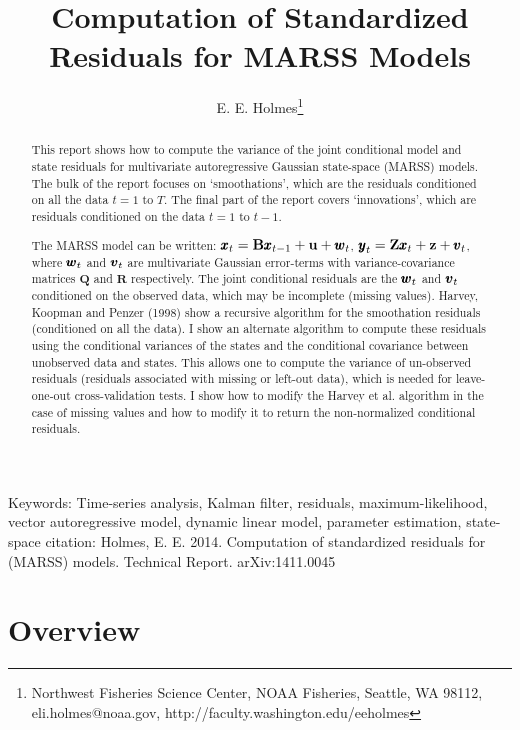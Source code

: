 \documentclass[]{article}
\def\UPS{\mbox{\boldmath $\Upsilon$}}
\def\XI{\mbox{\boldmath $\Xi$}}
\def\BB{\mbox{$\mathbf B$}}	\def\bb{\mbox{$\mathbf b$}} \def\Bb{\mbox{$\mathbf J$}} \def\Ba{\mbox{$\mathbf L$}} \def\Bm{\UPS}
\def\QQ{\mbox{$\mathbf Q$}}	 \def\qq{\mbox{$\mathbf q$}} \def\Qb{\mbox{$\mathbf G$}}  \def\Qm{\mathbb{Q}}
\def\RR{\mbox{$\mathbf R$}}	 \def\rr{\mbox{$\mathbf r$}} \def\Rb{\mbox{$\mathbf H$}}	\def\Rm{\mathbb{R}}
\def\ZZ{\mbox{$\mathbf Z$}}	\def\zz{\mbox{$\mathbf z$}}	\def\Zb{\mbox{$\mathbf M$}} \def\Za{\mbox{$\mathbf N$}} \def\Zm{\XI}
\begin{document}

\author{E. E. Holmes\footnote{Northwest Fisheries Science Center, NOAA Fisheries, Seattle, WA 98112, 
       eli.holmes@noaa.gov, http://faculty.washington.edu/eeholmes}}
\title{Computation of Standardized Residuals for MARSS Models}
\maketitle
\begin{abstract}
This report shows how to compute the variance of the joint conditional model and state residuals for multivariate autoregressive Gaussian state-space (MARSS) models. The bulk of the report focuses on `smoothations', which are the residuals conditioned on all the data $t=1$ to $T$. The final part of the report covers `innovations', which are residuals conditioned on the data $t=1$ to $t-1$.  

The MARSS model can be written: $\xx_t=\BB\xx_{t-1}+\uu+\ww_t$, $\yy_t=\ZZ\xx_t+\zz+\vv_t$, where $\mbox{$\pmb{w}$}_t$ and $\mbox{$\pmb{v}$}_t$ are multivariate Gaussian error-terms with variance-covariance matrices $\QQ$ and $\RR$ respectively. The joint conditional residuals are the $\mbox{$\pmb{w}$}_t$ and $\mbox{$\pmb{v}$}_t$ conditioned on the observed data, which may be incomplete (missing values). Harvey, Koopman and Penzer (1998) show a recursive algorithm for the smoothation residuals (conditioned on all the data). I show an alternate algorithm to compute these residuals using the conditional variances of the states and the conditional covariance between unobserved data and states. This allows one to compute the variance of un-observed residuals (residuals associated with missing or left-out data), which is needed for leave-one-out cross-validation tests. I show how to modify the Harvey et al. algorithm in the case of missing values and how to modify it to return the non-normalized conditional residuals.
\end{abstract}
Keywords: Time-series analysis, Kalman filter, residuals, maximum-likelihood, vector autoregressive model, dynamic linear model, parameter estimation, state-space
\vfill
{\noindent \small citation: Holmes, E. E. 2014. Computation of standardized residuals for (MARSS) models. Technical Report. arXiv:1411.0045 }
 \newpage
 
\section{Overview}
\end{document}
